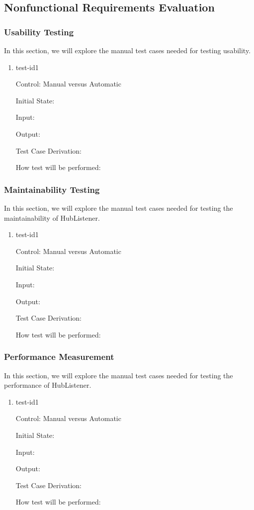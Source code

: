 \documentclass[12pt, titlepage]{article}
\begin{document}
\subsection{Nonfunctional Requirements Evaluation}

\subsubsection{Usability Testing}
In this section, we will explore the manual test cases needed for testing usability. 
\begin{enumerate}
\item{test-id1\\}

Control: Manual versus Automatic
					
Initial State: 
					
Input: 
					
Output: 

Test Case Derivation: 
					
How test will be performed: 
\end{enumerate}
\subsubsection{Maintainability  Testing}
In this section, we will explore the manual test cases needed for testing  the maintainability of HubListener. 
\begin{enumerate}
\item{test-id1\\}

Control: Manual versus Automatic
					
Initial State: 
					
Input: 
					
Output: 

Test Case Derivation: 
					
How test will be performed: 
\end{enumerate}
\subsubsection{Performance Measurement}

In this section, we will explore the manual test cases needed for testing the performance of HubListener. 
\begin{enumerate}
\item{test-id1\\}

Control: Manual versus Automatic
					
Initial State: 
					
Input: 
					
Output: 

Test Case Derivation: 
					
How test will be performed: 
\end{enumerate}
		
\end{document}
